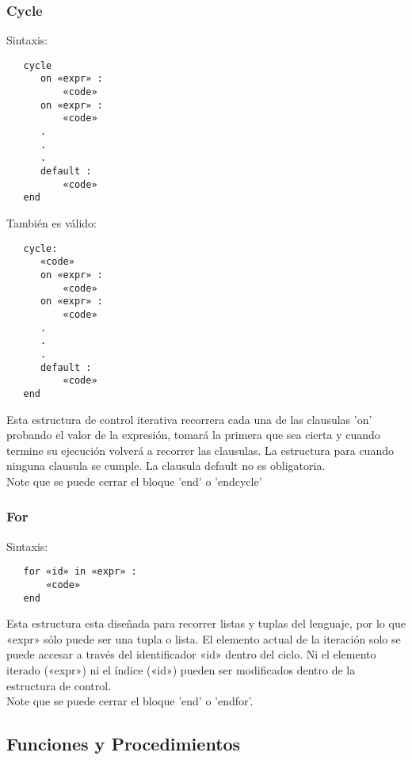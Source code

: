 \documentclass[12pt, spanish]{report}
\begin{document}
\subsubsection{Cycle}
Sintaxis:
\begin{verbatim}
   cycle
      on «expr» :
          «code»
      on «expr» :
          «code»
      .
      .
      .
      default :
          «code»
   end
\end{verbatim}
También es válido:
\begin{verbatim}
   cycle:
      «code»
      on «expr» :
          «code»
      on «expr» :
          «code»
      .
      .
      .
      default :
          «code»
   end
\end{verbatim}
Esta estructura de control iterativa recorrera cada una de las clausulas
'on' probando el valor de la expresión, tomará la primera que sea cierta
y cuando termine su ejecución volverá a recorrer las clausulas. La
estructura para cuando ninguna clausula se cumple. La clausula default no es obligatoria.\\
Note que se puede cerrar el bloque 'end' o 'endcycle'

\subsubsection{For}
Sintaxis:
\begin{verbatim}
   for «id» in «expr» :
       «code»
   end
\end{verbatim}

Esta estructura esta diseñada para recorrer listas y tuplas del
lenguaje, por lo que «expr» sólo puede ser una tupla o lista. El
elemento actual de la iteración solo se puede accesar a través del
identificador «id» dentro del ciclo. Ni el elemento iterado («expr») ni
el índice («id») pueden ser modificados dentro de la estructura de control.\\
Note que se puede cerrar el bloque 'end' o 'endfor'.

\subsection{Funciones y Procedimientos}
\label{sec:func}
\end{document}
